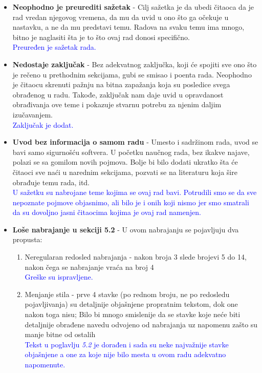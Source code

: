 \documentclass[a4paper]{report}
\newcommand{\odgovor}[1]{\textcolor{blue}{#1}}
\newcommand{\say}[1]{\textit{#1}}
\begin{document}
\begin{itemize}
	\item \textbf{Neophodno je preurediti sažetak} - Cilj sažetka je da ubedi čitaoca da je rad vredan njegovog vremena, da mu da uvid u ono što ga očekuje u nastavku, a ne da mu predstavi temu. Radova na svaku temu ima mnogo, bitno je naglasiti šta je to što ovaj rad donosi specifično.\\
	\odgovor{Preuređen je sažetak rada.}
	\item \textbf{Nedostaje zaključak} - Bez adekvatnog zaključka, koji će spojiti sve ono što je rečeno u prethodnim sekcijama, gubi se smisao i poenta rada. Neophodno je čitaocu skrenuti pažnju na bitna zapažanja koja su posledice svega obrađenog u radu. Takođe, zaključak nam daje uvid u opravdanost obrađivanja ove teme i pokazuje stvarnu potrebu za njenim daljim izučavanjem.\\
	\odgovor{Zaključak je dodat.}
	\item \textbf{Uvod bez informacija o samom radu} - Umesto i sadržinom rada, uvod se bavi samo sigurnošću softvera. U početku naučnog rada, bez ikakve najave, polazi se sa gomilom novih pojmova. Bolje bi bilo dodati ukratko šta će čitaoci sve naći u narednim sekcijama, pozvati se na literaturu koja šire obrađuje temu rada, itd.\\
	\odgovor{U sažetku su nabrojane teme kojima se ovaj rad bavi. Potrudili smo se da sve nepoznate pojmove objasnimo, ali bilo je i onih koji nismo jer smo smatrali da su dovoljno jasni čitaocima kojima je ovaj rad namenjen.}
	\item \textbf{Loše nabrajanje u sekciji 5.2} - U ovom nabrajanju se pojavljuju dva propusta:
	\begin{enumerate}
		\item Neregularan redosled nabrajanja - nakon broja 3 slede brojevi 5 do 14, nakon čega se nabrajanje vraća na broj 4\\
		\odgovor{Greške su ispravljene.}
		\item Menjanje stila - prve 4 stavke (po rednom broju, ne po redosledu pojavljivanja) su detaljnije objašnjene propratnim tekstom, dok one nakon toga nisu; Bilo bi mnogo smislenije da se stavke koje neće biti detaljnije obrađene navedu odvojeno od nabrajanja uz napomenu zašto su manje bitne od ostalih\\
		\odgovor{ Tekst u poglavlju \say{5.2} je dorađen i sada su neke najvažnije stavke objašnjene a one za koje nije bilo mesta u ovom radu adekvatno napomenute. }
	\end{enumerate}
\end{itemize}
\end{document}
